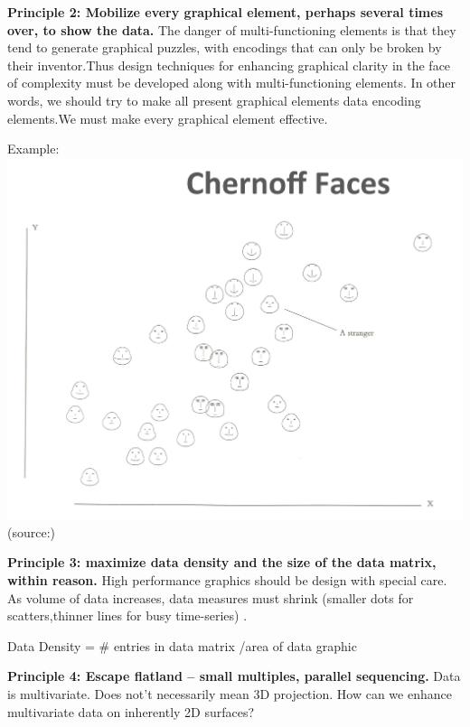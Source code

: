 \documentclass[]{book}
\theoremstyle{definition}
\theoremstyle{definition}
\theoremstyle{definition}
\theoremstyle{remark}
\begin{document}
\textbf{Principle 2: Mobilize every graphical element, perhaps several
times over, to show the data.} The danger of multi-functioning elements
is that they tend to generate graphical puzzles, with encodings that can
only be broken by their inventor.Thus design techniques for enhancing
graphical clarity in the face of complexity must be developed along with
multi-functioning elements. In other words, we should try to make all
present graphical elements data encoding elements.We must make every
graphical element effective.

Example: \includegraphics{images/Tufte_figure6.png}
(source:\citep{Tufte_2001})

\textbf{Principle 3: maximize data density and the size of the data
matrix, within reason.} High performance graphics should be design with
special care. As volume of data increases, data measures must shrink
(smaller dots for scatters,thinner lines for busy time-series)
\citep{best-practice}.

Data Density = \# entries in data matrix /area of data graphic

\textbf{Principle 4: Escape flatland -- small multiples, parallel
sequencing.} Data is multivariate. Does not't necessarily mean 3D
projection. How can we enhance multivariate data on inherently 2D
surfaces?
\end{document}

